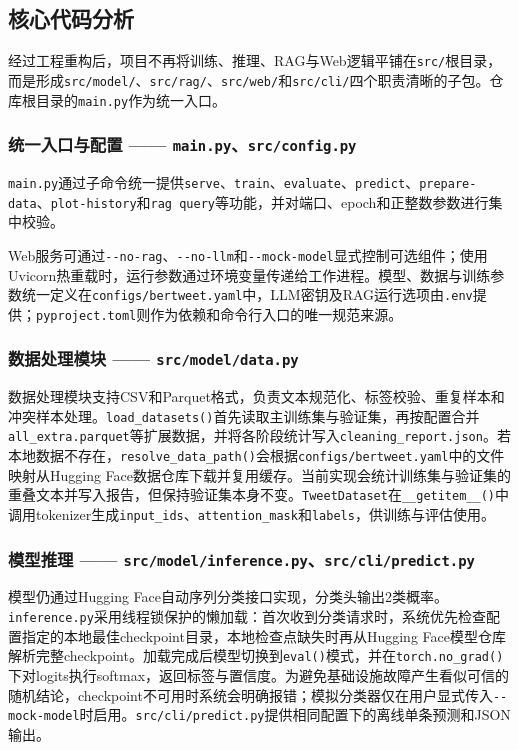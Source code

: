 \documentclass[10pt]{article}
\newcommand{\code}[1]{\allowbreak\texttt{#1}\allowbreak}
\begin{document}
\subsection{核心代码分析}

经过工程重构后，项目不再将训练、推理、RAG与Web逻辑平铺在\code{src/}根目录，而是形成\code{src/model/}、\code{src/rag/}、\code{src/web/}和\code{src/cli/}四个职责清晰的子包。仓库根目录的\code{main.py}作为统一入口。

\subsubsection{统一入口与配置 —— \code{main.py}、\code{src/config.py}}

\code{main.py}通过子命令统一提供\code{serve}、\code{train}、\code{evaluate}、\code{predict}、\code{prepare-data}、\code{plot-history}和\code{rag query}等功能，并对端口、epoch和正整数参数进行集中校验。

Web服务可通过\code{-{}-no-rag}、\code{-{}-no-llm}和\code{-{}-mock-model}显式控制可选组件；使用Uvicorn热重载时，运行参数通过环境变量传递给工作进程。模型、数据与训练参数统一定义在\code{configs/bertweet.yaml}中，LLM密钥及RAG运行选项由\code{.env}提供；\code{pyproject.toml}则作为依赖和命令行入口的唯一规范来源。

\subsubsection{数据处理模块 —— \code{src/model/data.py}}

数据处理模块支持CSV和Parquet格式，负责文本规范化、标签校验、重复样本和冲突样本处理。\code{load\_}\code{datasets()}首先读取主训练集与验证集，再按配置合并\code{all\_}\code{extra.parquet}等扩展数据，并将各阶段统计写入\code{cleaning\_}\code{report.json}。若本地数据不存在，\code{resolve\_data\_path()}会根据\code{configs/bertweet.yaml}中的文件映射从Hugging Face数据仓库下载并复用缓存。当前实现会统计训练集与验证集的重叠文本并写入报告，但保持验证集本身不变。\code{TweetDataset}在\code{\_\_getitem\_\_()}中调用tokenizer生成\code{input\_ids}、\code{attention\_mask}和\code{labels}，供训练与评估使用。

\subsubsection{模型推理 —— \code{src/model/inference.py}、\code{src/cli/predict.py}}

模型仍通过Hugging Face自动序列分类接口实现，分类头输出2类概率。\code{inference.py}采用线程锁保护的懒加载：首次收到分类请求时，系统优先检查配置指定的本地最佳checkpoint目录，本地检查点缺失时再从Hugging Face模型仓库解析完整checkpoint。加载完成后模型切换到\code{eval()}模式，并在\code{torch.no\_grad()}下对logits执行softmax，返回标签与置信度。为避免基础设施故障产生看似可信的随机结论，checkpoint不可用时系统会明确报错；模拟分类器仅在用户显式传入\code{-{}-mock-model}时启用。\code{src/cli/predict.py}提供相同配置下的离线单条预测和JSON输出。
\end{document}
